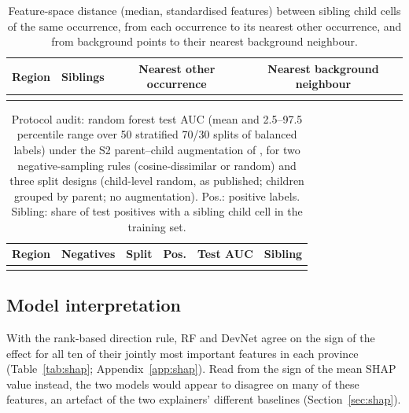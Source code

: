 \documentclass[pdflatex,sn-apa]{sn-jnl}
\begin{document}
\begin{table}[t]
\caption{Feature-space distance (median, standardised features) between sibling child cells of the same occurrence, from each occurrence to its nearest other occurrence, and from background points to their nearest background neighbour.}\label{tab:audit-sim}
\footnotesize
\begin{tabular*}{0.8\textwidth}{@{\extracolsep\fill}lccc}
\toprule
Region & Siblings & Nearest other occurrence & Nearest background neighbour \\
\midrule
\botrule
\end{tabular*}
\end{table}

\begin{table}[t]
\caption{Protocol audit: random forest test AUC (mean and 2.5--97.5 percentile range over 50 stratified 70/30 splits of balanced labels) under the S2 parent--child augmentation of \citet{Parsa2024}, for two negative-sampling rules (cosine-dissimilar or random) and three split designs (child-level random, as published; children grouped by parent; no augmentation). Pos.: positive labels. Sibling: share of test positives with a sibling child cell in the training set.}\label{tab:audit}
\scriptsize
\setlength{\tabcolsep}{2.5pt}
\begin{tabular*}{\textwidth}{@{\extracolsep\fill}lllccc}
\toprule
Region & Negatives & Split & Pos. & Test AUC & Sibling \\
\midrule
\botrule
\end{tabular*}
\end{table}

\subsection{Model interpretation}\label{sec:res-shap}

With the rank-based direction rule, RF and DevNet agree on the sign of the effect for all ten of their jointly most important features in each province (Table~\ref{tab:shap}; Appendix~\ref{app:shap}). Read from the sign of the mean SHAP value instead, the two models would appear to disagree on many of these features, an artefact of the two explainers' different baselines (Section~\ref{sec:shap}).
\end{document}
